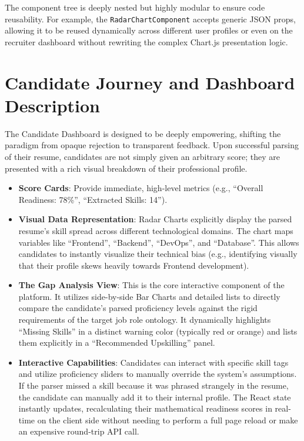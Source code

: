 \documentclass[12pt,a4paper]{report}
\begin{document}
The component tree is deeply nested but highly modular to ensure code reusability. For example, the \texttt{RadarChartComponent} accepts generic JSON props, allowing it to be reused dynamically across different user profiles or even on the recruiter dashboard without rewriting the complex Chart.js presentation logic.

\section{Candidate Journey and Dashboard Description}

The Candidate Dashboard is designed to be deeply empowering, shifting the paradigm from opaque rejection to transparent feedback. Upon successful parsing of their resume, candidates are not simply given an arbitrary score; they are presented with a rich visual breakdown of their professional profile.

\begin{itemize}
    \item \textbf{Score Cards}: Provide immediate, high-level metrics (e.g., ``Overall Readiness: 78\%'', ``Extracted Skills: 14'').
    \item \textbf{Visual Data Representation}: Radar Charts explicitly display the parsed resume's skill spread across different technological domains. The chart maps variables like ``Frontend'', ``Backend'', ``DevOps'', and ``Database''. This allows candidates to instantly visualize their technical bias (e.g., identifying visually that their profile skews heavily towards Frontend development).
    \item \textbf{The Gap Analysis View}: This is the core interactive component of the platform. It utilizes side-by-side Bar Charts and detailed lists to directly compare the candidate's parsed proficiency levels against the rigid requirements of the target job role ontology. It dynamically highlights ``Missing Skills'' in a distinct warning color (typically red or orange) and lists them explicitly in a ``Recommended Upskilling'' panel.
    \item \textbf{Interactive Capabilities}: Candidates can interact with specific skill tags and utilize proficiency sliders to manually override the system's assumptions. If the parser missed a skill because it was phrased strangely in the resume, the candidate can manually add it to their internal profile. The React state instantly updates, recalculating their mathematical readiness scores in real-time on the client side without needing to perform a full page reload or make an expensive round-trip API call.
\end{itemize}
\end{document}
